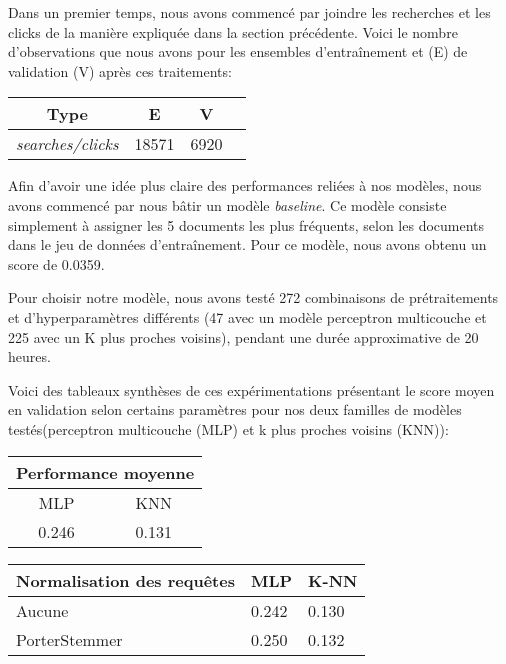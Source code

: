 Dans un premier temps, nous avons commencé par joindre les recherches et les clicks de la manière expliquée dans la section précédente. Voici le nombre d'observations que nous avons pour les ensembles d'entraînement et (E) de validation (V) après ces traitements:

\begin{center}
  \begin{tabular}{ |c|c|c|c| } 
     \hline
     Type & E & V \\
     \hline
     \hline
     \textit{searches/clicks} & 18571 & 6920 \\ 
     \hline
  \end{tabular}
\end{center}

Afin d'avoir une idée plus claire des performances reliées à nos modèles, nous avons commencé par nous bâtir un modèle \textit{baseline}. Ce modèle consiste simplement à assigner les 5 documents les plus fréquents, selon les documents dans le jeu de données d'entraînement. Pour ce modèle, nous avons obtenu un score de 0.0359.
\break


Pour choisir notre modèle, nous avons testé 272 combinaisons de prétraitements et d'hyperparamètres différents (47 avec un modèle perceptron multicouche et 225 avec un K plus proches voisins), pendant une durée approximative de 20 heures. 
\break

Voici des tableaux synthèses de ces expérimentations présentant le score moyen en validation selon certains paramètres pour nos deux familles de modèles testés(perceptron multicouche (MLP) et k plus proches voisins (KNN)):

\begin{center}
\begin{tabular}{|c|c|}
\hline
\multicolumn{2}{|c|}{\textbf{Performance moyenne}} \\ \hline
MLP & KNN \\ \hline
0.246 & 0.131 \\ \hline
\end{tabular}
\end{center}


\begin{center}
\begin{tabular}{|l|l|l|}
\hline
\textbf{Normalisation des requêtes} & MLP & K-NN \\ \hline
Aucune                     & 0.242                  & 0.130                  \\ \hline
PorterStemmer              & 0.250                  & 0.132                  \\ \hline
\end{tabular}
\end{center}


